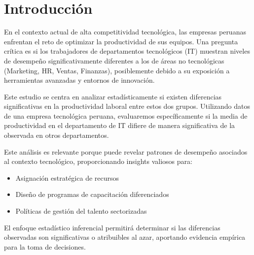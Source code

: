 \vspace*{\fill}

\section{Introducción}

En el contexto actual de alta competitividad tecnológica, las empresas peruanas enfrentan el reto de optimizar la productividad de sus equipos. Una pregunta crítica es si los trabajadores de departamentos tecnológicos (IT) muestran niveles de desempeño significativamente diferentes a los de áreas no tecnológicas (Marketing, HR, Ventas, Finanzas), posiblemente debido a su exposición a herramientas avanzadas y entornos de innovación.

Este estudio se centra en analizar estadísticamente si existen diferencias significativas en la productividad laboral entre estos dos grupos. Utilizando datos de una empresa tecnológica peruana, evaluaremos específicamente si la media de productividad en el departamento de IT difiere de manera significativa de la observada en otros departamentos. 

Este análisis es relevante porque puede revelar patrones de desempeño asociados al contexto tecnológico, proporcionando insights valiosos para:

\begin{itemize}
  \item Asignación estratégica de recursos
  \item Diseño de programas de capacitación diferenciados
  \item Políticas de gestión del talento sectorizadas
\end{itemize}

El enfoque estadístico inferencial permitirá determinar si las diferencias observadas son significativas o atribuibles al azar, aportando evidencia empírica para la toma de decisiones.

\vspace*{\fill}